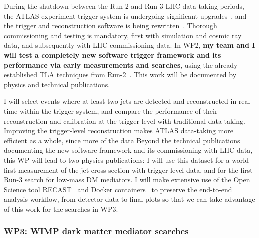 \documentclass[11pt,a4paper]{article}
\begin{document}
During the shutdown between the Run-2 and Run-3 LHC data taking periods, the ATLAS experiment trigger system is undergoing significant upgrades~\cite{FEXes}, and the trigger and reconstruction software is being rewritten~\cite{MT}. 
Thorough commissioning and testing is mandatory, first with simulation and cosmic ray data, and subsequently with LHC commissioning data. 
In WP2, \textbf{my team and I will test a completely new software trigger framework and its performance via early measurements and searches}, using the already-established TLA techniques from Run-2~\cite{TLAPRL}. This work will be documented by physics and technical publications.  

I will select events where at least two jets are detected and reconstructed in real-time within the trigger system, and compare the performance of their reconstruction and calibration at the trigger level with traditional data taking. 
Improving the trigger-level reconstruction makes ATLAS data-taking more efficient as a whole, since more of the data  
Beyond the technical publications documenting the new software framework and its commissioning with LHC data, this WP will lead to two physics publications:  
I will use this dataset for a world-first measurement of the jet cross section with trigger level data, and for the first Run-3 search for low-mass DM mediators. 
I will make extensive use of the Open Science tool RECAST~\cite{RECAST} and Docker containers~\cite{Docker} to preserve the end-to-end analysis workflow, from detector data to final plots so that we can take advantage of this work for the searches in WP3.  

\subsubsection*{WP3: WIMP dark matter mediator searches}
\end{document}
